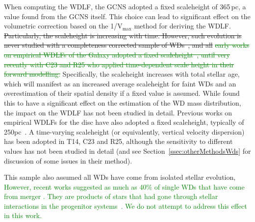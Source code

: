 \documentclass[fleqn,usenatbib]{mnras}
\begin{document}
When computing the WDLF, the GCNS adopted a fixed scaleheight of 365\,pc, a
value found from the GCNS itself. This choice can lead to significant effect
on the volumetric correction based on the 1/V$_{\mathrm{max}}$ method for
deriving the WDLF.
%
\sout{Particularly, the scaleheight is increasing with time.
However, such evolution is never studied with a completeness corrected sample
of WDs~\mbox{\citep{2006AJ....131..571H}}, and all }\textcolor{green}{\sout{early works on empirical WDLFs 
of the Galaxy adopted a fixed scaleheight~\mbox{\citep{2006AJ....131..571H,
2011MNRAS.417...93R, 2019MNRAS.482..715L}}, until very recently with C23 and
R25 who applied time-dependent scale height in their forward modelling.}}
\textcolor{nick}{
Specifically, the scaleheight increases with total stellar age, which will manifest
as an increased average scaleheight for faint WDs and an overestimation of their
spatial density if a fixed value is assumed. While \citet{2016MNRAS.461.2100T} found
this to have a significant effect on the estimation of the WD mass distribution,
the impact on the WDLF has not been studied in detail. Previous works on empirical
WDLFs for the disc have also adopted a fixed scaleheight, typically of 250pc~\citep{2006AJ....131..571H,
2011MNRAS.417...93R, 2019MNRAS.482..715L}.
A time-varying scaleheight (or equivalently, 
vertical velocity dispersion) has been adopted in T14, C23 and R25, although
the sensitivity to different values has not been studied in detail (and see 
Section~\ref{ssec:otherMethodsWds} for discussion of some issues in their method).}

This sample also assumed all WDs have come from isolated stellar evolution,
\textcolor{green}{However, recent works suggested as much as 40\% of single
WDs that have come from merger \citep{2020A&A...636A..31T, 2020ApJ...898...84K}.
They are products
of stars that had gone through stellar interactions in the progenitor
systems~\citep[e.g.\ ][]{2013A&ARv..21...59I, 2023arXiv231117145H}. We do not
attempt to address this effect in this work.}
\end{document}

